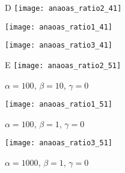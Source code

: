 \begin{figure}[h]
\begin{subfigure}[b]{0.3\textwidth}
    	D
		\centering
        \texttt{[image: anaoas\_ratio2\_41]}
        \label{fig:anaoas_ratio2_41}
	\end{subfigure}
    \hfill
    \begin{subfigure}[b]{0.3\textwidth}
		\centering
        \texttt{[image: anaoas\_ratio1\_41]}
        \label{fig:anaoas_ratio1_41}
	\end{subfigure}
    \hfill
    \begin{subfigure}[b]{0.3\textwidth}
		\centering
        \texttt{[image: anaoas\_ratio3\_41]}
        \label{fig:anaoas_ratio3_41}
	\end{subfigure}
    \begin{subfigure}[b]{0.3\textwidth}
    	E
		\centering
        \texttt{[image: anaoas\_ratio2\_51]}
        \caption{$\alpha = 100$, $\beta = 10$, $\gamma = 0$}
        \label{fig:anaoas_ratio2_51}
	\end{subfigure}
    \hfill
    \begin{subfigure}[b]{0.3\textwidth}
		\centering
        \texttt{[image: anaoas\_ratio1\_51]}
        \caption{$\alpha = 100$, $\beta = 1$, $\gamma = 0$}
        \label{fig:anaoas_ratio2_51}
	\end{subfigure}
    \hfill
    \begin{subfigure}[b]{0.3\textwidth}
		\centering
        \texttt{[image: anaoas\_ratio3\_51]}
        \caption{$\alpha = 1000$, $\beta = 1$, $\gamma = 0$}
        \label{fig:anaoas_ratio3_51}
	\end{subfigure}
    \caption{}
    \label{fig:tradeoff}
\end{figure}